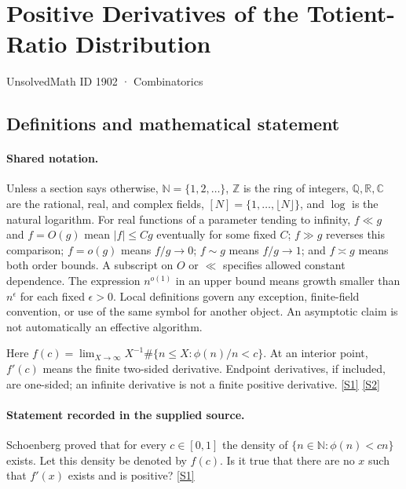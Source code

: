 \documentclass[11pt,a4paper]{article}
\newcommand{\N}{\mathbb{N}}
\newcommand{\Z}{\mathbb{Z}}
\newcommand{\Q}{\mathbb{Q}}
\newcommand{\R}{\mathbb{R}}
\newcommand{\C}{\mathbb{C}}
\newcommand{\sref}[2]{\hyperlink{source:#1:#2}{[S#2]}}
\begin{document}

\setcounter{section}{1901}

\section{Positive Derivatives of the Totient-Ratio Distribution}\label{1902}

{\small\sffamily UnsolvedMath ID 1902 · Combinatorics}

\subsection{Definitions and mathematical statement}

\paragraph{Shared notation.}Unless a section says otherwise, $\N=\{1,2,\ldots\}$,
$\Z$ is the ring of integers, $\Q,\R,\C$ are the rational, real, and complex
fields, $[N]=\{1,\ldots,\lfloor N\rfloor\}$, and $\log$ is the natural
logarithm. For real functions of a parameter tending to infinity,
$f\ll g$ and $f=O(g)$ mean $|f|\leq Cg$ eventually for some fixed $C$;
$f\gg g$ reverses this comparison; $f=o(g)$ means $f/g\to0$;
$f\sim g$ means $f/g\to1$; and $f\asymp g$ means both order bounds.
A subscript on $O$ or $\ll$ specifies allowed constant dependence.
The expression $n^{o(1)}$ in an upper bound means growth smaller than
$n^\epsilon$ for each fixed $\epsilon>0$. Local definitions govern any
exception, finite-field convention, or use of the same symbol for another
object. An asymptotic claim is not automatically an effective algorithm.



Here $f(c)=\lim_{X\to\infty}X^{-1}\#\{n\leq X:\phi(n)/n<c\}$. At an interior point, $f'(c)$ means the finite two-sided derivative. Endpoint derivatives, if included, are one-sided; an infinite derivative is not a finite positive derivative. \sref{1902}{1} \sref{1902}{2}

\paragraph{Statement recorded in the supplied source.}
Schoenberg proved that for every $c\in [0,1]$ the density of $ \{ n\in \mathbb{N} : \phi(n)<cn\} $ exists. Let this density be denoted by $f(c)$. Is it true that there are no $x$ such that $f'(x)$ exists and is positive? \sref{1902}{1}
\end{document}
